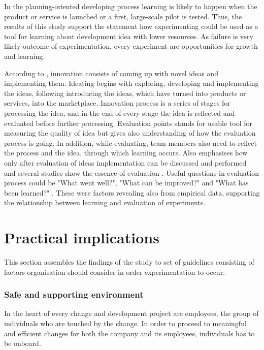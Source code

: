 In the planning-oriented developing process learning is likely to happen when the product or service is launched or a first, large-scale pilot is tested. Thus, the results of this study support the statement how experimenting could be used as a tool for learning about development idea with lower resources. As failure is very likely outcome of experimentation, every experiment are opportunities for growth and learning. 

According to \citet{buijs2007innovation}, innovation consists of coming up with novel ideas and implementing them. Ideating begins with exploring, developing and implementing the ideas, following introducing the ideas, which have turned into products or services, into the marketplace. Innovation process is a series of stages for processing the idea, and in the end of every stage the idea is reflected and evaluated before further processing. Evaluation points stands for usable tool for measuring the quality of idea but gives also understanding of how the evaluation process is going. In addition, while evaluating, team members also need to reflect the process and the idea, through which learning occurs. Also \citep{runco1994problem} emphasises how only after evaluation of ideas implementation can be discussed and performed and several studies show the essence of evaluation \citep{mumford2002leading,vincent2002divergent}. Useful questions in evaluation process could be "What went well?", "What can be improved?" and "What has been learned?" \citep{buijs2007innovation}. These were factors revealing also from empirical data, supporting the relationship between learning and evaluation of experiments. 

\section{Practical implications} \label{framework}
This section assembles the findings of the study to set of guidelines consisting of factors organisation should consider in order experimentation to occur.

\subsubsection*{Safe and supporting environment}
In the heart of every change and development project are employees, the group of individuals who are touched by the change. In order to proceed to meaningful and efficient changes for both the company and its employees, individuals has to be onboard. 

